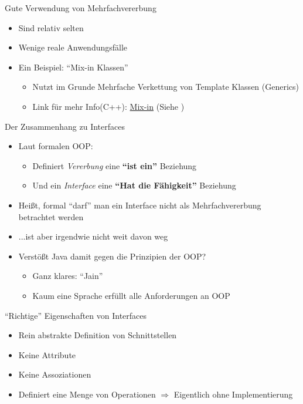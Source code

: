 \begin{frame}{Gute Verwendung von Mehrfachvererbung}
\begin{itemize}
    \item Sind relativ selten
    \item Wenige reale Anwendungsfälle
    \item Ein Beispiel: "`Mix-in Klassen"'
    \begin{itemize}
        \item Nutzt im Grunde Mehrfache Verkettung von Template Klassen (Generics)
        \item Link für mehr Info(C++): \href{http://www.thinkbottomup.com.au/site/blog/C\%20\%20_Mixins_-_Reuse_through_inheritance_is_good}{Mix-in} (Siehe \cite{mixin})
    \end{itemize}
\end{itemize}
\end{frame}

\begin{frame}{Der Zusammenhang zu Interfaces}
    \begin{itemize}[<+->]
        \item Laut formalen OOP:
        \begin{itemize}
            \item Definiert \textit{Vererbung} eine \textbf{"`ist ein"'} Beziehung
            \item Und ein \textit{Interface} eine \textbf{"`Hat die Fähigkeit"'} Beziehung
        \end{itemize}
        \item Heißt, formal "`darf"' man ein Interface nicht als Mehrfachvererbung betrachtet werden
        \item ...ist aber irgendwie nicht weit davon weg
        \item Verstößt Java damit gegen die Prinzipien der OOP?
        \begin{itemize}[<handout:0>]
            \item Ganz klares: "`Jain"'
            \item Kaum eine Sprache erfüllt alle Anforderungen an OOP
        \end{itemize}
    \end{itemize}
\end{frame}

\begin{frame}{"`Richtige"' Eigenschaften von Interfaces}
    \begin{itemize}
        \item Rein abstrakte Definition von Schnittstellen
        \item Keine Attribute
        \item Keine Assoziationen
        \item Definiert eine Menge von Operationen $\Rightarrow$ Eigentlich ohne Implementierung
    \end{itemize}
\end{frame}
